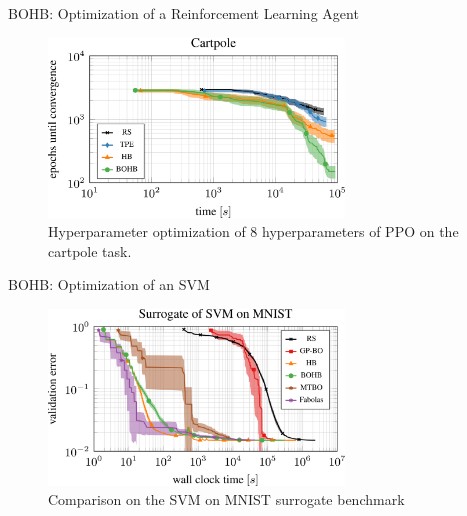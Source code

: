 \begin{frame}{BOHB: Optimization of a Reinforcement Learning Agent}
\begin{figure}
    \centering
    \includegraphics[width=0.70\textwidth]{../w07_hpo_speedup/images/bohb/cartpole-1.png}
    \caption{Hyperparameter optimization of 8 hyperparameters of PPO on the cartpole task.}
\end{figure}

\end{frame}
\begin{frame}{BOHB: Optimization of an SVM}
\begin{figure}
    \centering
    \includegraphics[width=0.70\textwidth]{../w07_hpo_speedup/images/bohb/svm_surrogate_test_pdf-1.png}
    \caption{Comparison on the SVM on MNIST surrogate benchmark}
\end{figure}

\end{frame}
